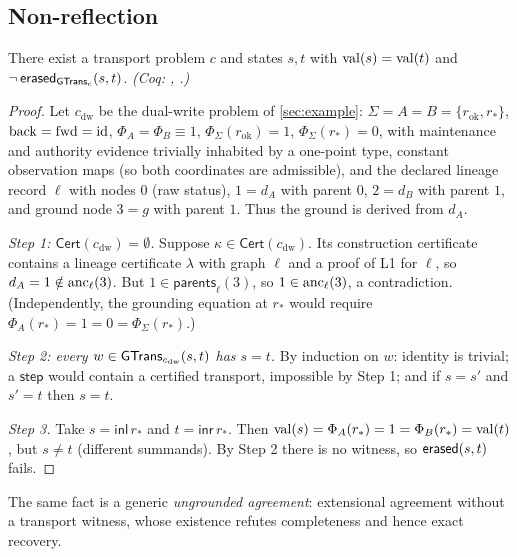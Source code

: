 \subsection{Non-reflection}
\begin{thm}\label{thm:nonreflect}
There exist a transport problem $c$ and states $s,t$ with $\mathrm{val}(s) = \mathrm{val}(t)$ and $\neg\,\mathsf{erased}_{\mathsf{GTrans}_c}(s,t)$. \emph{(Coq: , .)}
\end{thm}
\begin{proof}
Let $c_{\mathrm{dw}}$ be the dual-write problem of \cref{sec:example}: $\Sigma = A = B = \{r_{\mathrm{ok}}, r_*\}$, $\mathrm{back} = \mathrm{fwd} = \mathrm{id}$, $\Phi_A = \Phi_B \equiv 1$, $\Phi_\Sigma(r_{\mathrm{ok}}) = 1$, $\Phi_\Sigma(r_*) = 0$, with maintenance and authority evidence trivially inhabited by a one-point type, constant observation maps (so both coordinates are admissible), and the declared lineage record $\ell$ with nodes $0$ (raw status), $1 = d_A$ with parent $0$, $2 = d_B$ with parent $1$, and ground node $3 = g$ with parent $1$. Thus the ground is derived from $d_A$.

\emph{Step 1: $\mathsf{Cert}(c_{\mathrm{dw}}) = \emptyset$.} Suppose $\kappa \in \mathsf{Cert}(c_{\mathrm{dw}})$. Its construction certificate contains a lineage certificate $\lambda$ with graph $\ell$ and a proof of L1 for $\ell$, so $d_A = 1 \notin \mathrm{anc}_\ell(3)$. But $1 \in \mathsf{parents}_\ell(3)$, so $1 \in \mathrm{anc}_\ell(3)$, a contradiction. (Independently, the grounding equation at $r_*$ would require $\Phi_A(r_*) = 1 = 0 = \Phi_\Sigma(r_*)$.)

\emph{Step 2: every $w \in \mathsf{GTrans}_{c_{\mathrm{dw}}}(s,t)$ has $s = t$.} By induction on $w$: identity is trivial; a $\mathsf{step}$ would contain a certified transport, impossible by Step 1; and if $s = s'$ and $s' = t$ then $s = t$.

\emph{Step 3.} Take $s = \mathsf{inl}\,r_*$ and $t = \mathsf{inr}\,r_*$. Then $\mathrm{val}(s) = \Phi_A(r_*) = 1 = \Phi_B(r_*) = \mathrm{val}(t)$, but $s \neq t$ (different summands). By Step 2 there is no witness, so $\mathsf{erased}(s,t)$ fails.
\end{proof}
The same fact is a generic \emph{ungrounded agreement}: extensional agreement without a transport witness, whose existence refutes completeness and hence exact recovery.


